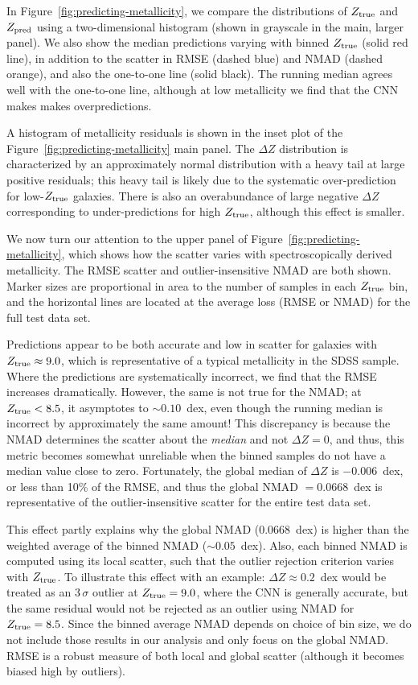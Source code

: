 \documentclass[fleqn,usenatbib]{mnras}
\begin{document}
In Figure~\ref{fig:predicting-metallicity}, we compare the distributions of $Z_{\rm true}$ and $Z_{\rm pred}$ using a two-dimensional histogram (shown in grayscale in the main, larger panel). We also show the median predictions varying with binned $Z_{\rm true}$ (solid red line), in addition to the scatter in RMSE (dashed blue) and NMAD (dashed orange), and also the one-to-one line (solid black). The running median agrees well with the one-to-one line, although at low metallicity we find that the CNN makes makes overpredictions.

A histogram of metallicity residuals is shown in the inset plot of the Figure~\ref{fig:predicting-metallicity} main panel. The $\Delta Z$ distribution is characterized by an approximately normal distribution with a heavy tail at large positive residuals; this heavy tail is likely due to the systematic over-prediction for low-$Z_{\rm true}$ galaxies.
There is also an overabundance of large negative $\Delta Z$ corresponding to under-predictions for high $Z_{\rm true}$, although this effect is smaller.

We now turn our attention to the upper panel of Figure~\ref{fig:predicting-metallicity}, which shows how the scatter varies with spectroscopically derived metallicity. The RMSE scatter and outlier-insensitive NMAD are both shown. Marker sizes are proportional in area to the number of samples in each $Z_{\rm true}$ bin, and the horizontal lines are located at the average loss (RMSE or NMAD) for the full test data set.

Predictions appear to be both accurate and low in scatter for galaxies with $Z_{\rm true} \approx 9.0$, which is representative of a typical metallicity in the SDSS sample. Where the predictions are systematically incorrect, we find that the RMSE increases dramatically. However, the same is not true for the NMAD; at $Z_{\rm true} < 8.5$, it asymptotes to $\sim 0.10$~dex, even though the running median is incorrect by approximately the same amount! This discrepancy is because the NMAD determines the scatter about the \textit{median} and not $\Delta Z = 0$, and thus, this metric becomes somewhat unreliable when the binned samples do not have a median value close to zero. Fortunately, the global median of $\Delta Z$ is $-0.006$~dex, or less than 10\% of the RMSE, and thus the global NMAD $= 0.0668$~dex is representative of the outlier-insensitive scatter for the entire test data set.

This effect partly explains why the global NMAD ($0.0668$~dex) is higher than the weighted average of the binned NMAD ($\sim 0.05$~dex). Also, each binned NMAD is computed using its local scatter, such that the outlier rejection criterion varies with $Z_{\rm true}$. To illustrate this effect with an example: $\Delta Z \approx 0.2$~dex would be treated as an $3\,\sigma$ outlier at $Z_{\rm true} = 9.0$, where the CNN is generally accurate, but the same residual would not be rejected as an outlier using NMAD for $Z_{\rm true} = 8.5$.
Since the binned average NMAD depends on choice of bin size, we do not include those results in our analysis and only focus on the global NMAD.
RMSE is a robust measure of both local and global scatter (although it becomes biased high by outliers).
\end{document}
